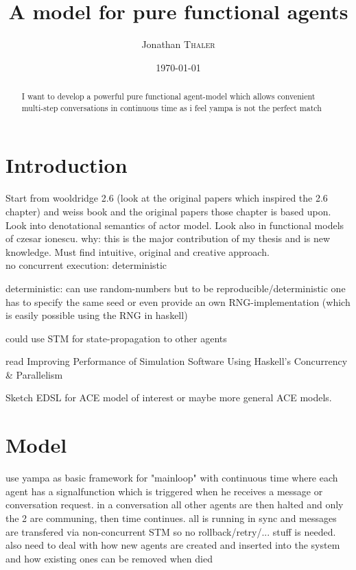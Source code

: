 \documentclass{article}
\title{A model for pure functional agents} %
\author{Jonathan \textsc{Thaler}}
\date{\today}
\begin{document}
\maketitle 

\begin{abstract}
I want to develop a powerful pure functional agent-model which allows convenient multi-step conversations in continuous time as i feel yampa is not the perfect match
\end{abstract}

\section{Introduction}
Start from wooldridge 2.6 (look at the original papers which inspired the 2.6 chapter) and weiss book and the original papers those chapter is based upon. Look into denotational semantics of actor model. Look also in functional models of czesar ionescu. why: this is the major contribution of my thesis and is new knowledge. Must find intuitive, original and creative approach. \\

no concurrent execution: deterministic

deterministic: can use random-numbers but to be reproducible/deterministic one has to specify the same seed or even provide an own RNG-implementation (which is easily possible using the RNG in haskell)

could use STM for state-propagation to other agents

read Improving Performance of Simulation Software Using Haskell’s Concurrency \& Parallelism

Sketch EDSL for ACE model of interest or maybe more general ACE models.

\section{Model}
use yampa as basic framework for "mainloop" with continuous time where each agent has a signalfunction which is triggered when he receives a message or conversation request. in a conversation all other agents are then halted and only the 2 are communing, then time continues. all is running in sync and messages are transfered via non-concurrent STM so no rollback/retry/... stuff is needed. also need to deal with how new agents are created and inserted into the system and how existing ones can be removed when died





\end{document}
